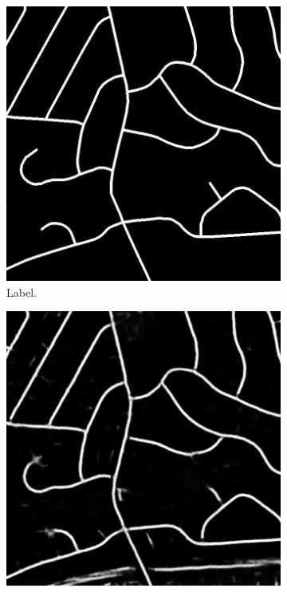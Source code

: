\begin{figure}[H]
\begin{subfigure}{0.23\textwidth}
\includegraphics[width=\textwidth]{figs/appendix/label20878930_15.jpg}
\caption{ Label. }
\vspace{0.2cm} %
\end{subfigure}
\hspace*{\fill} %
\begin{subfigure}{0.23\textwidth}
\includegraphics[width=\textwidth]{figs/appendix/pred20878930_15.jpg}

\end{subfigure}
\end{figure}
